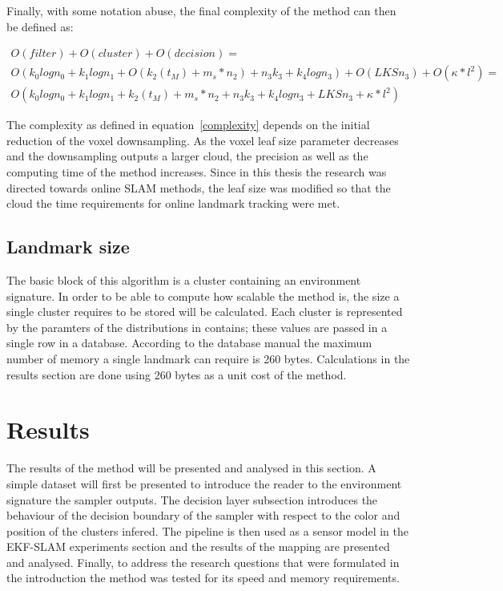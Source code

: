 \documentclass[twoside,hidelinks]{article}
\begin{document}
Finally, with some notation abuse, the final complexity of the method can then be defined as:

\begin{equation} \label{complexity}
\begin{split}
O(filter) + O(cluster) + O(decision) = \\
O(k_{0}logn_{0} + k_{1}logn_{1} + O(k_{2}(t_M)+ m_s*n_{2}) + n_{3}k_{3} + k_{4}logn_{3} ) + O(LKSn_3) + O(\kappa * l^2)=\\
O(k_{0}logn_{0} + k_{1}logn_{1} + k_{2}(t_M)+ m_s*n_{2} + n_{3}k_{3} + k_{4}logn_{3} + LKSn_3 + \kappa * l^2)
\end{split}
\end{equation}

The complexity as defined in equation~\ref{complexity} depends on the initial reduction of the voxel downsampling. As the voxel leaf size parameter decreases and the downsampling outputs a larger cloud, the precision as well as the computing time of the method increases. Since in this thesis the research was directed towards online SLAM methods, the leaf size was modified so that the cloud the time requirements for online landmark tracking were met.

\subsection{Landmark size}


The basic block of this algorithm is a cluster containing an environment signature. In order to be able to compute how scalable the method is, the size a single cluster requires to be stored will be calculated. Each cluster is represented by the paramters of the distributions in contains; these values are passed in a single row in a database\cite{sqlite}. According to the database manual the maximum number of memory a single landmark can require is 260 bytes. Calculations in the results section are done using 260 bytes as a unit cost of the method. 

\newpage
\section{Results}
\label{sec:results}

The results of the method will be presented and analysed in this section. A simple dataset will first be presented to introduce the reader to the environment signature the sampler outputs. The decision layer subsection introduces the behaviour of the decision boundary of the sampler with respect to the color and position of the clusters infered. The pipeline is then used as a sensor model in the EKF-SLAM experiments section and the results of the mapping are presented and analysed. Finally, to address the research questions that were formulated in the introduction the method was tested for its speed and memory requirements.
\end{document}
